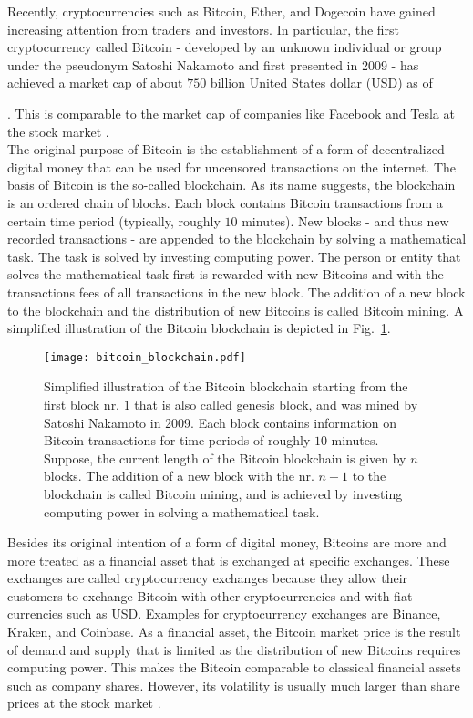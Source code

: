 Recently, cryptocurrencies such as Bitcoin, Ether, and Dogecoin have gained increasing attention from traders and investors. In particular, the first cryptocurrency called Bitcoin - developed by an unknown individual or group under the pseudonym Satoshi Nakamoto and first presented in 2009 \cite{Bitcoin2009} - has achieved a market cap of about $750$ billion United States dollar (USD) as of \date{14 June 2021}. This is comparable to the market cap of companies like Facebook and Tesla at the stock market \cite{MarketCapCompany2021}\cite{MarketCapBitcoin2021}.\\

The original purpose of Bitcoin is the establishment of a form of decentralized digital money that can be used for uncensored transactions on the internet. The basis of Bitcoin is the so-called blockchain. As its name suggests, the blockchain is an ordered chain of blocks. Each block contains Bitcoin transactions from a certain time period (typically, roughly $10$ minutes). New blocks - and thus new recorded transactions - are appended to the blockchain by solving a mathematical task. The task is solved by investing computing power. The person or entity that solves the mathematical task first is rewarded with new Bitcoins and with the transactions fees of all transactions in the new block. The addition of a new block to the blockchain and the distribution of new Bitcoins is called Bitcoin mining. A simplified illustration of the Bitcoin blockchain is depicted in Fig.~\ref{fig:blockchain}.

\begin{figure}[h!]
  \centering
  \texttt{[image: bitcoin\_blockchain.pdf]}
  \caption{Simplified illustration of the Bitcoin blockchain starting from the first block nr. $1$ that is also called genesis block, and was mined by Satoshi Nakamoto in 2009. Each block contains information on Bitcoin transactions for time periods of roughly $10$ minutes. Suppose, the current length of the Bitcoin blockchain is given by $n$ blocks. The addition of a new block with the nr. $n+1$ to the blockchain is called Bitcoin mining, and is achieved by investing computing power in solving a mathematical task.}
  \label{fig:blockchain}
\end{figure}

Besides its original intention of a form of digital money, Bitcoins are more and more treated as a financial asset that is exchanged at specific exchanges. These exchanges are called cryptocurrency exchanges because they allow their customers to exchange Bitcoin with other cryptocurrencies and with fiat currencies such as USD. Examples for cryptocurrency exchanges are Binance, Kraken, and Coinbase. As a financial asset, the Bitcoin market price is the result of demand and supply that is limited as the distribution of new Bitcoins requires computing power. This makes the Bitcoin comparable to classical financial assets such as company shares. However, its volatility is usually much larger than share prices at the stock market \cite{bitcoin_book_2018}. \\

